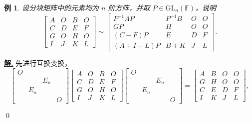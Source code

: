 \documentclass[10pt,openany]{article}
\theoremstyle{thmstyle} %
\theoremstyle{defstyle} %
\theoremstyle{prostyle} %
\theoremstyle{exastyle}
\newtheorem{example}[theorem]{例}
\theoremstyle{remstyle}
\newenvironment{solution}{\par\underline{\textbf{解.}} \;\fangsong}{\qed\par}
\newcommand{\gfn}{\text{GL}_n(\mathbb{F})}
\begin{document}
\begin{example}
	设分块矩阵中的元素均为 \( n \) 阶方阵，并取 \( P \in \gfn \)，说明
	\[ \begin{bmatrix}
		A & O & B & O \\
		C & D & E & F \\
		G & O & H & O \\
		I & J & K & L
	\end{bmatrix} \sim \begin{bmatrix}
	P^{-1}AP & P^{-1}B & O & O \\
	GP & H & O & O \\
	(C-F)P & E & D & F \\
	(A+I-L)P & B+K & J & L
	\end{bmatrix}. \]
\end{example}

\begin{solution}
	先进行互换变换，
	\[ \begin{bmatrix}
		O & & & \\
		& & E_n & \\
		& E_n & & \\
		& & & O 
	\end{bmatrix}\begin{bmatrix}
	A & O & B & O \\
	C & D & E & F \\
	G & O & H & O \\
	I & J & K & L
	\end{bmatrix}\begin{bmatrix}
	O & & & \\
	& & E_n & \\
	& E_n & & \\
	& & & O 
	\end{bmatrix}=\begin{bmatrix}
	A & B & O & O \\
	G & H & O & O \\
	C & E & D & F \\
	I & K & J & L
	\end{bmatrix}, \]
	

\end{solution}
\end{document}
